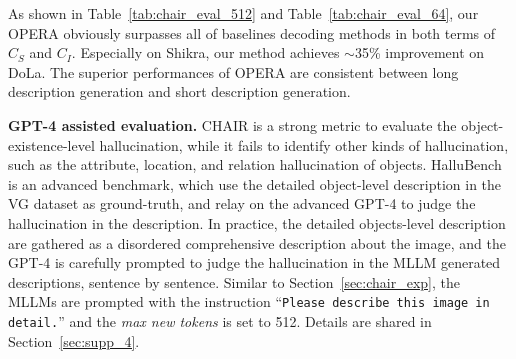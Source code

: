 \documentclass[10pt,twocolumn,letterpaper]{article}
\newcommand{\Tref}[1]{Table~\ref{#1}}
\newcommand{\Sref}[1]{Section~\ref{#1}}
\begin{document}
As shown in \Tref{tab:chair_eval_512} and \Tref{tab:chair_eval_64}, our OPERA obviously surpasses all of baselines decoding methods in both terms of $C_S$ and $C_I$. 
Especially on Shikra, our method achieves $\sim$35\% improvement on DoLa. 
The superior performances of OPERA are consistent between long description generation and short description generation. 













\noindent\textbf{GPT-4 assisted evaluation.} 
CHAIR is a strong metric to evaluate the object-existence-level hallucination, while it fails to identify other kinds of hallucination, such as the attribute, location, and relation hallucination of objects.
HalluBench \cite{2023zhiyuan} is an advanced benchmark, which use the detailed object-level description in the VG dataset \cite{krishna2017visual} as ground-truth, and relay on the advanced GPT-4 to judge the hallucination in the description.
In practice, the detailed objects-level description are gathered as a disordered comprehensive description about the image, and the GPT-4 is carefully prompted to judge the hallucination in the MLLM generated descriptions, sentence by sentence.
Similar to \Sref{sec:chair_exp}, the MLLMs are prompted with the instruction ``\texttt{Please describe this image in detail.}'' and the \textit{max new tokens} is set to 512.
Details are shared in \Sref{sec:supp_4}.
\end{document}
